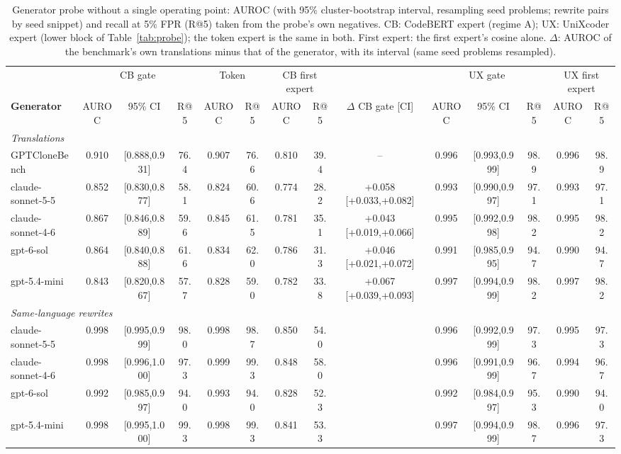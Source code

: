 \begin{table}[t]
\centering
\caption{Generator probe without a single operating point: AUROC (with 95\% cluster-bootstrap interval, resampling seed problems; rewrite pairs by seed snippet) and recall at 5\% FPR (R@5) taken from the probe's own negatives. CB: CodeBERT expert (regime A); UX: UniXcoder expert (lower block of Table~\ref{tab:probe}); the token expert is the same in both. First expert: the first expert's cosine alone. $\Delta$: AUROC of the benchmark's own translations minus that of the generator, with its interval (same seed problems resampled).}
\label{tab:probe-auc}
\scriptsize
\setlength{\tabcolsep}{2.2pt}
\begin{tabular}{l|ccc|cc|cc|c|ccc|cc}
\toprule
 & \multicolumn{3}{c|}{CB gate} & \multicolumn{2}{c|}{Token} & \multicolumn{2}{c|}{CB first expert} & & \multicolumn{3}{c|}{UX gate} & \multicolumn{2}{c}{UX first expert} \\
\textbf{Generator} & AUROC & 95\% CI & R@5 & AUROC & R@5 & AUROC & R@5 & $\Delta$ CB gate [CI] & AUROC & 95\% CI & R@5 & AUROC & R@5 \\
\midrule
\multicolumn{14}{l}{\emph{Translations}} \\
GPTCloneBench & 0.910 & [0.888,0.931] & 76.4 & 0.907 & 76.6 & 0.810 & 39.4 & -- & 0.996 & [0.993,0.999] & 98.9 & 0.996 & 98.9 \\
claude-sonnet-5-5 & 0.852 & [0.830,0.877] & 58.1 & 0.824 & 60.6 & 0.774 & 28.2 & +0.058 [+0.033,+0.082] & 0.993 & [0.990,0.997] & 97.1 & 0.993 & 97.1 \\
claude-sonnet-4-6 & 0.867 & [0.846,0.889] & 59.6 & 0.845 & 61.5 & 0.781 & 35.1 & +0.043 [+0.019,+0.066] & 0.995 & [0.992,0.998] & 98.2 & 0.995 & 98.2 \\
gpt-6-sol & 0.864 & [0.840,0.888] & 61.6 & 0.834 & 62.0 & 0.786 & 31.3 & +0.046 [+0.021,+0.072] & 0.991 & [0.985,0.995] & 94.7 & 0.990 & 94.7 \\
gpt-5.4-mini & 0.843 & [0.820,0.867] & 57.7 & 0.828 & 59.0 & 0.782 & 33.8 & +0.067 [+0.039,+0.093] & 0.997 & [0.994,0.999] & 98.2 & 0.997 & 98.2 \\
\midrule
\multicolumn{14}{l}{\emph{Same-language rewrites}} \\
claude-sonnet-5-5 & 0.998 & [0.995,0.999] & 98.0 & 0.998 & 98.7 & 0.850 & 54.0 &  & 0.996 & [0.992,0.999] & 97.3 & 0.995 & 97.3 \\
claude-sonnet-4-6 & 0.998 & [0.996,1.000] & 97.3 & 0.999 & 99.3 & 0.848 & 58.0 &  & 0.996 & [0.991,0.999] & 96.7 & 0.994 & 96.7 \\
gpt-6-sol & 0.992 & [0.985,0.997] & 94.0 & 0.993 & 94.0 & 0.828 & 52.3 &  & 0.992 & [0.984,0.997] & 95.3 & 0.990 & 94.0 \\
gpt-5.4-mini & 0.998 & [0.995,1.000] & 99.3 & 0.998 & 99.3 & 0.841 & 53.3 &  & 0.997 & [0.994,0.999] & 98.7 & 0.996 & 97.3 \\
\bottomrule
\end{tabular}
\end{table}